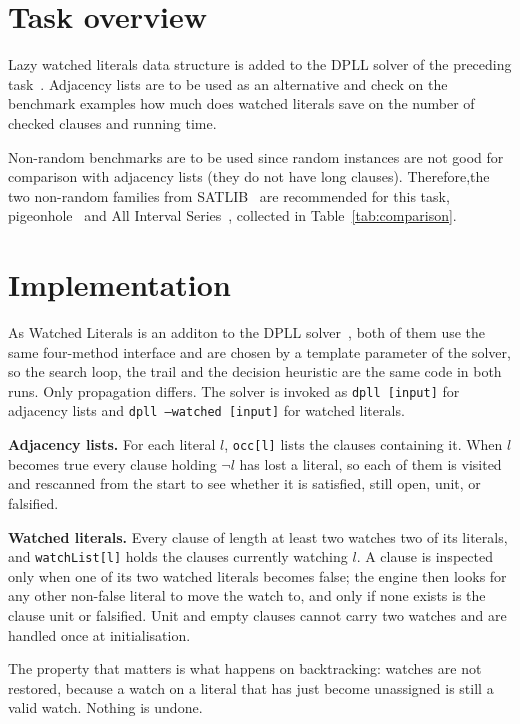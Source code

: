 \documentclass[11pt,a4paper]{article}
\begin{document}
\makereporttitle

\section{Task overview}

Lazy watched literals data structure is added to the DPLL solver of the
preceding task~\cite{dpllreport}.
Adjacency lists are to be used as an alternative and check
on the benchmark examples how much does watched literals save on
the number of checked clauses and running time.

Non-random benchmarks are to be used since random instances are not
good for comparison with adjacency lists (they do not have long clauses).
Therefore,the two non-random families from SATLIB~\cite{satlib} are
recommended for this task, pigeonhole~\cite{phole} and All Interval
Series~\cite{ais}, collected in Table~\ref{tab:comparison}. 
\section{Implementation}

As Watched Literals is an additon to the DPLL solver~\cite{dpllreport}, both of
them use
the same four-method interface and are chosen by a
template parameter of the solver, so the search loop, the trail and the decision
heuristic are the same code in both runs. Only propagation differs. The solver
is invoked as \texttt{dpll [input]} for adjacency lists and
\texttt{dpll --watched [input]} for watched literals.

\textbf{Adjacency lists.} For each literal $l$, \texttt{occ[l]} lists the
clauses containing it. When $l$ becomes true every clause holding $\lnot l$ has
lost a literal, so each of them is visited and rescanned from the start to see
whether it is satisfied, still open, unit, or falsified.

\begin{sloppypar}
\textbf{Watched literals.} Every clause of length at least two watches two of
its literals, and \texttt{watchList[l]} holds the clauses currently watching
$l$. A clause is inspected only when one of its two watched literals becomes
false; the engine then looks for any other non-false literal to move the watch
to, and only if none exists is the clause unit or falsified. Unit and empty
clauses cannot carry two watches and are handled once at initialisation.
\end{sloppypar}

The property that matters is what happens on backtracking: watches are not
restored, because a watch on a literal that has just become unassigned is still
a valid watch. Nothing is undone.
\end{document}
